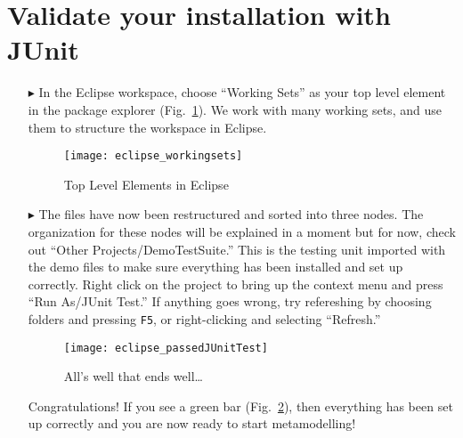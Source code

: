 \newpage
\genHeader
{}

\section{Validate your installation with JUnit}

\begin{itemize}

\item[$\blacktriangleright$] In\hypertarget{validate common}{} the Eclipse workspace, choose ``Working Sets'' as your top level element in the package explorer (Fig.~\ref{fig_topLevel}). We work with many working sets, and use them to structure the workspace in Eclipse.

\begin{figure}[htbp]
	\centering
  \texttt{[image: eclipse\_workingsets]}
	\caption{Top Level Elements in Eclipse}
	\label{fig_topLevel}
\end{figure}

\item[$\blacktriangleright$] The files have now been restructured and sorted into three nodes. The organization for these nodes will be explained in a moment but for now, check out ``Other Projects/DemoTestSuite.'' This is the testing unit imported with the demo files to make sure everything has been installed and set up correctly. Right click on the project to bring up the context menu and press ``Run As/JUnit Test.'' If anything goes wrong, try refereshing by choosing folders and pressing  \texttt{F5}, or right-clicking and selecting ``Refresh.''

\vspace{0.5cm}

\begin{figure}[htbp]
	\centering
  \texttt{[image: eclipse\_passedJUnitTest]}
	\caption{All's well that ends well\ldots}
	\label{fig_passedTest}
\end{figure}

\vspace{0.5cm}

Congratulations!  If you see a green bar  (Fig.~\ref{fig_passedTest}), then everything has been set up correctly and you are now ready to start metamodelling!

\end{itemize}